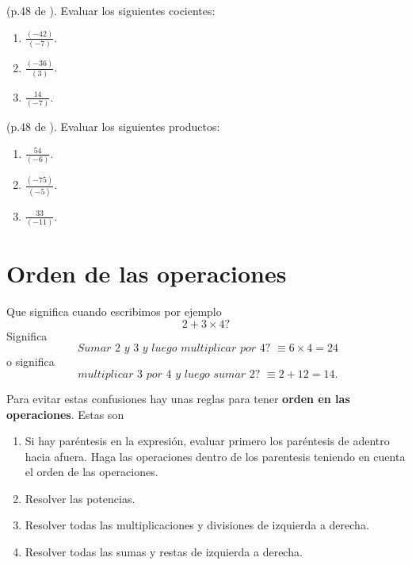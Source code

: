 \begin{ejemplo}
	(p.48 de \cite{Dimensions_Math_7A}). Evaluar los siguientes cocientes:
	\begin{multicols}{3}
		\begin{enumerate}[label=\Alph*)]
			\item $\frac{(-42)}{(-7)} $.
			\item $\frac{(-36)}{(3)} $.
			\item $\frac{14}{(-7)} $.						
		\end{enumerate}	
	\end{multicols}
\end{ejemplo}

\begin{exer}
	(p.48 de \cite{Dimensions_Math_7A}). Evaluar los siguientes productos:
	\begin{multicols}{3}
		\begin{enumerate}[label=\Alph*)]
			\item $\frac{54}{(-6)} $.
			\item $\frac{(-75)}{(-5)} $.			
			\item $\frac{33}{(-11)} $.			
		\end{enumerate}	
	\end{multicols}
\end{exer}

\section{Orden de las operaciones}\label{subsubsection_orden_de_las_operaciones}
Que significa cuando escribimos por ejemplo
\[
		2+3\times 4?
\]
Significa 
\[
		\textit{ Sumar 2 y 3 y luego multiplicar por 4? } \equiv 6\times 4=24
\]
o significa 
\[
\textit{ multiplicar 3 por 4 y luego sumar 2? } \equiv 2+12=14.
\]

\begin{tcolorbox}[colback=red!5!white,colframe=red!75!black]
	Para evitar estas confusiones hay unas reglas para tener \textbf{orden en las operaciones}. Estas son
	\begin{enumerate}
		\item Si hay paréntesis en la expresión, evaluar primero los paréntesis de adentro hacia afuera. Haga las operaciones dentro de los parentesis teniendo en cuenta el orden de las operaciones.
		\item Resolver las potencias.
		\item Resolver todas las multiplicaciones y divisiones de izquierda a derecha.
		\item Resolver todas las sumas y restas de izquierda a derecha.
	\end{enumerate}
\end{tcolorbox}


